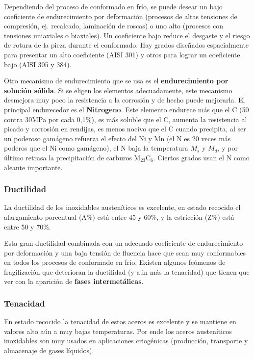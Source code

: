 Dependiendo del proceso de conformado en frío, se puede desear un bajo coeficiente de endurecimiento por deformación (procesos de altas tensiones de compresión, ej. recalcado, laminación de roscas) o uno alto (procesos con tensiones uniaxiales o biaxiales). Un coeficiente bajo reduce el desgaste y el riesgo de rotura de la pieza durante el conformado. Hay grados diseñados espacialmente para presentar un alto coeficiente (AISI 301) y otros para lograr un coeficiente bajo (AISI 305 y 384).

Otro mecanismo de endurecimiento que se usa es el \textbf{endurecimiento por solución sólida}. Si se eligen los elementos adecuadamente, este mecanismo desmejora muy poco la resistencia a la corrosión y de hecho puede mejorarla. El principal endurecedor es el \textbf{Nitrogeno}. Este elemento endurece más que el C (50 contra 30MPa por cada 0,1\%), es más soluble que el C, aumenta la resistencia al picado y corrosión en rendijas, es menos nocivo que el C cuando precipita, al ser un poderoso gamágeno refuerza el efecto del Ni y Mn (el N es 20 veces más poderos que el Ni como gamágeno), el N baja la temperatura $M_s$ y $M_d$, y por último retrasa la precipitación de carburos M$_{23}$C$_{6}$. Ciertos grados usan el N como aleante importante.

\subsubsection{Ductilidad}
La ductilidad de los inoxidables austeníticos es excelente, en estado recocido el alargamiento porcentual (A\%) está entre 45 y 60\%, y la estricción (Z\%) está entre 50 y 70\%. 

Esta gran ductilidad combinada con un adecuado coeficiente de endurecimiento por deformación y una baja tensión de fluencia hace que sean muy conformables en todos los procesos de conformado en frío. Existen algunos feómenos de fragilización que deterioran la ductilidad (y aún más la tenacidad) que tienen que ver con la aparición de \textbf{fases intermetálicas}.

\subsubsection{Tenacidad}
En estado recocido la tenacidad de estos aceros es excelente y se mantiene en valores alto aún a muy bajas temperaturas. Por ende los aceros austeníticos inoxidables son muy usados en aplicaciones criogénicas (producción, transporte y almacenaje de gases líquidos).

